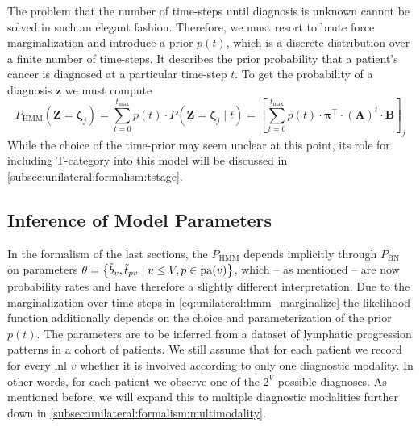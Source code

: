 \documentclass[\relativeRoot/main.tex]{subfiles}
\begin{document}
The problem that the number of time-steps until diagnosis is unknown cannot be solved in such an elegant fashion. Therefore, we must resort to brute force marginalization and introduce a prior $p(t)$, which is a discrete distribution over a finite number of time-steps. It describes the prior probability that a patient's cancer is diagnosed at a particular time-step $t$. To get the probability of a diagnosis $\mathbf{z}$ we must compute
%
\begin{equation} \label{eq:unilateral:hmm_marginalize}
    P_\text{HMM} \left( \mathbf{Z} = \boldsymbol{\zeta}_j \right) = \sum_{t = 0}^{t_\text{max}}{p(t) \cdot P\left( \mathbf{Z} = \boldsymbol{\zeta}_j \mid t \right)} = \left[ \sum_{t = 0}^{t_\text{max}}{p(t) \cdot \boldsymbol{\pi}^\top \cdot (\mathbf{A})^t \cdot \mathbf{B}} \right]_j
\end{equation}
%
While the choice of the time-prior may seem unclear at this point, its role for including T-category into this model will be discussed in \cref{subsec:unilateral:formalism:tstage}.

\subsection{Inference of Model Parameters}
\label{subsec:unilateral:formalism:inference}

In the formalism of the last sections, the $P_\text{HMM}$ depends implicitly through $P_\text{BN}$ on parameters $\theta = \left\{ \Tilde{b}_v , \Tilde{t}_{pv} \mid v \leq V , p \in \operatorname{pa}(v) \right\}$, which -- as mentioned -- are now probability rates and have therefore a slightly different interpretation. Due to the marginalization over time-steps in \cref{eq:unilateral:hmm_marginalize} the likelihood function additionally depends on the choice and parameterization of the prior $p(t)$. The parameters are to be inferred from a dataset of lymphatic progression patterns in a cohort of patients. We still assume that for each patient we record for every \gls{lnl} $v$ whether it is involved according to only one diagnostic modality. In other words, for each patient we observe one of the $2^V$ possible diagnoses. As mentioned before, we will expand this to multiple diagnostic modalities further down in \cref{subsec:unilateral:formalism:multimodality}.
\end{document}
